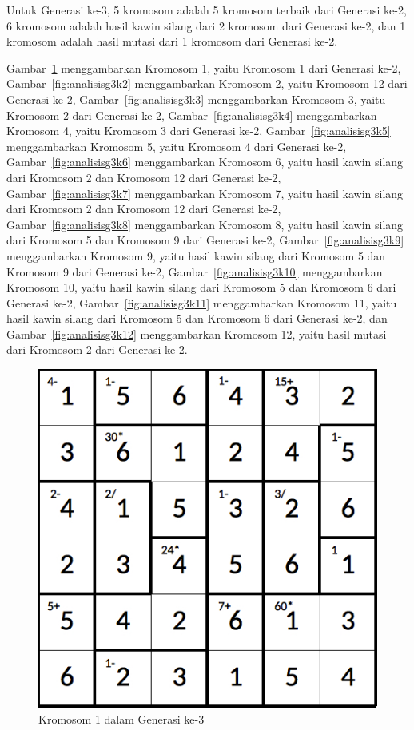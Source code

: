 Untuk Generasi ke-3, 5 kromosom adalah 5 kromosom terbaik dari Generasi ke-2, 6 kromosom adalah hasil kawin silang dari 2 kromosom dari Generasi ke-2, dan 1 kromosom adalah hasil mutasi dari 1 kromosom dari Generasi ke-2.

Gambar~\ref{fig:analisisg3k1} menggambarkan Kromosom 1, yaitu Kromosom 1 dari Generasi ke-2, Gambar~\ref{fig:analisisg3k2} menggambarkan Kromosom 2, yaitu Kromosom 12 dari Generasi ke-2, Gambar~\ref{fig:analisisg3k3} menggambarkan Kromosom 3, yaitu Kromosom 2 dari Generasi ke-2, Gambar~\ref{fig:analisisg3k4} menggambarkan Kromosom 4, yaitu Kromosom 3 dari Generasi ke-2, Gambar~\ref{fig:analisisg3k5} menggambarkan Kromosom 5, yaitu Kromosom 4 dari Generasi ke-2, Gambar~\ref{fig:analisisg3k6} menggambarkan Kromosom 6, yaitu hasil kawin silang dari Kromosom 2 dan Kromosom 12 dari Generasi ke-2, Gambar~\ref{fig:analisisg3k7} menggambarkan Kromosom 7, yaitu hasil kawin silang dari Kromosom 2 dan Kromosom 12 dari Generasi ke-2, Gambar~\ref{fig:analisisg3k8} menggambarkan Kromosom 8, yaitu hasil kawin silang dari Kromosom 5 dan Kromosom 9 dari Generasi ke-2, Gambar~\ref{fig:analisisg3k9} menggambarkan Kromosom 9, yaitu hasil kawin silang dari Kromosom 5 dan Kromosom 9 dari Generasi ke-2, Gambar~\ref{fig:analisisg3k10} menggambarkan Kromosom 10, yaitu hasil kawin silang dari Kromosom 5 dan Kromosom 6 dari Generasi ke-2, Gambar~\ref{fig:analisisg3k11} menggambarkan Kromosom 11, yaitu hasil kawin silang dari Kromosom 5 dan Kromosom 6 dari Generasi ke-2, dan Gambar~\ref{fig:analisisg3k12} menggambarkan Kromosom 12, yaitu hasil mutasi dari Kromosom 2 dari Generasi ke-2.

\clearpage

\begin{figure}
\centering
\captionsetup{justification=centering}
\includegraphics[scale=0.333]{Gambar/hybridgenetic/Generation3Chromosome1}
\caption[Kromosom 1 dalam Generasi ke-3]{Kromosom 1 dalam Generasi ke-3}
\label{fig:analisisg3k1}
\end{figure}


